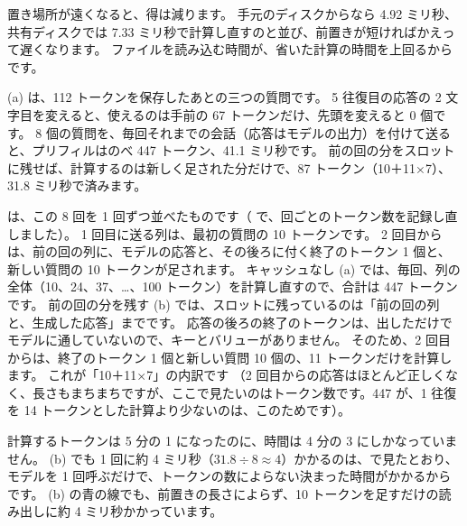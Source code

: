 置き場所が遠くなると、得は減ります。
手元のディスクからなら 4.92 ミリ秒、共有ディスクでは 7.33 ミリ秒で計算し直すのと並び、前置きが短ければかえって遅くなります。
ファイルを読み込む時間が、省いた計算の時間を上回るからです。

(a) は、112 トークンを保存したあとの三つの質問です。
5 往復目の応答の 2 文字目を変えると、使えるのは手前の 67 トークンだけ、先頭を変えると 0 個です。
8 個の質問を、毎回それまでの会話（応答はモデルの出力）を付けて送ると、プリフィルはのべ 447 トークン、41.1 ミリ秒です。
前の回の分をスロットに残せば、計算するのは新しく足された分だけで、87 トークン（10＋11×7）、31.8 ミリ秒で済みます。

は、この 8 回を 1 回ずつ並べたものです（ で、回ごとのトークン数を記録し直しました）。
1 回目に送る列は、最初の質問の 10 トークンです。
2 回目からは、前の回の列に、モデルの応答と、その後ろに付く終了のトークン 1 個と、新しい質問の 10 トークンが足されます。
キャッシュなし (a) では、毎回、列の全体（10、24、37、\dots、100 トークン）を計算し直すので、合計は 447 トークンです。
前の回の分を残す (b) では、スロットに残っているのは「前の回の列と、生成した応答」までです。
応答の後ろの終了のトークンは、出しただけでモデルに通していないので、キーとバリューがありません。
そのため、2 回目からは、終了のトークン 1 個と新しい質問 10 個の、11 トークンだけを計算します。
これが「10＋11×7」の内訳です
（2 回目からの応答はほとんど正しくなく、長さもまちまちですが、ここで見たいのはトークン数です。447 が、1 往復を 14 トークンとした計算より少ないのは、このためです）。

計算するトークンは 5 分の 1 になったのに、時間は 4 分の 3 にしかなっていません。
(b) でも 1 回に約 4 ミリ秒（$31.8\div8\approx4$）かかるのは、で見たとおり、モデルを 1 回呼ぶだけで、トークンの数によらない決まった時間がかかるからです。
(b) の青の線でも、前置きの長さによらず、10 トークンを足すだけの読み出しに約 4 ミリ秒かかっています。


